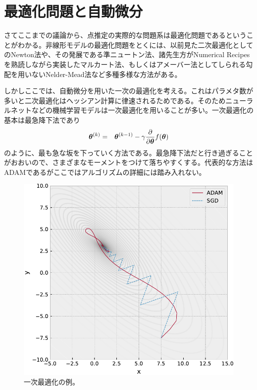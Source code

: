 \section{最適化問題と自動微分}
さてここまでの議論から、点推定の実際的な問題系は最適化問題であるということがわかる。非線形モデルの最適化問題をとくには、以前見た二次最適化としてのNewton法や、その発展である準ニュートン法、諸先生方がNumerical Recipesを熟読しながら実装したマルカート法、もしくはアメーバー法としてしられる勾配を用いないNelder-Mead法など多種多様な方法がある。

しかしここでは、自動微分を用いた一次の最適化を考える。これはパラメタ数が多いと二次最適化はヘッシアン計算に律速されるためである。そのためニューラルネットなどの機械学習モデルは一次最適化を用いることが多い。一次最適化の基本は最急降下法であり
\begin{eqnarray}
\boldsymbol{\theta}^{(k)} &=& \displaystyle{\boldsymbol{\theta}^{(k-1)} - \gamma \frac{\partial}{\partial \boldsymbol{\theta}} f(\boldsymbol{\theta})}
\end{eqnarray}
のように、最も急な坂を下っていく方法である。最急降下法だと行き過ぎることがおおいので、さまざまなモーメントをつけて落ちやすくする。代表的な方法はADAM\cite{kingma2015adam}であるがここではアルゴリズムの詳細には踏み入れない。

\begin{figure}[htb]
\begin{center}
\includegraphics[width=\linewidth]{fig/opt1.pdf}
\caption{一次最適化の例。\label{fig:opt1}}
\end{center}
\end{figure}

